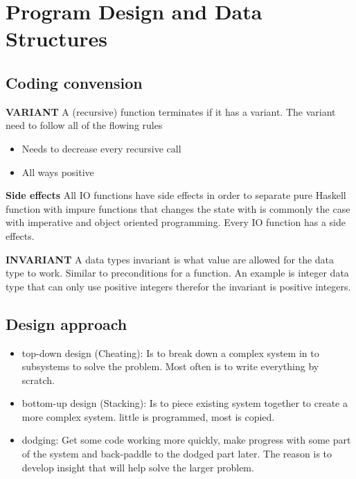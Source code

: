 \chapter{Program Design and Data Structures}

\newpage

\section{Coding convension}
\noindent\textbf{VARIANT} \newline
A (recursive) function terminates if it has a variant.
The variant need to follow all of the flowing rules

\begin{itemize}
\item Needs to decrease every recursive call
\item All ways positive
\end{itemize} 

\noindent\textbf{Side effects} \newline
All IO functions have side effects in order to separate pure Haskell function with impure functions
that changes the state with is commonly the case with imperative and object oriented programming.
Every IO function has a side effects.

\noindent\textbf{INVARIANT} \newline
A data types invariant is what value are allowed for the data type to work. Similar to preconditions for
a function. An example is integer data type that can only use positive integers therefor the
invariant is positive integers.



\section{Design approach}
\begin{itemize}
\item top-down design (Cheating): Is to break down a complex system in to subsystems to solve the problem.
  Most often is to write everything by scratch.
\item bottom-up design (Stacking): Is to piece existing system together to create a more complex system.
  little is programmed, most is copied.
\item dodging: Get some code working more quickly, make progress with some part of the system
  and back-paddle to the dodged part later. The reason is to develop insight that will help solve
  the larger problem.
\end{itemize}


